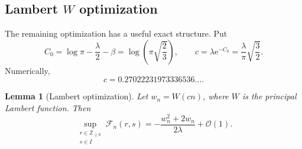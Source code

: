 \documentclass[11pt,oneside]{article}
\newtheorem{lemma}[lemma]{Lemma}
\theoremstyle{definition}
\theoremstyle{remark}
\newcommand{\Z}{\mathbb Z}
\newcommand{\e}{\mathrm e}
\newcommand{\bigO}{\mathcal O}
\begin{document}
\subsection{Lambert \texorpdfstring{\(W\)}{W} optimization}

The remaining optimization has a useful exact structure.  Put
\begin{equation}
 C_0=\log\pi-\frac\lambda2-\beta
 =\log\!\left(\pi\sqrt{\frac23}\right),
 \qquad
 c=\lambda\e^{-C_0}
 =\frac{\lambda}{\pi}\sqrt{\frac32}.
 \label{eq:C0-c}
\end{equation}
Numerically,
\begin{equation}
 c=0.27022231973336536\ldots.
 \label{eq:c-numeric}
\end{equation}

\begin{lemma}[Lambert optimization]
\label{lem:Lambert-optimization}
Let \(w_n=W(cn)\), where \(W\) is the principal Lambert function.  Then
\begin{equation}
 \sup_{\substack{r\in\Z_{\ge0}\\s\in I}}
 \mathcal F_n(r,s)
 =-\frac{w_n^2+2w_n}{2\lambda}+\bigO(1).
 \label{eq:Lambert-optimization-result}
\end{equation}
\end{lemma}
\end{document}
